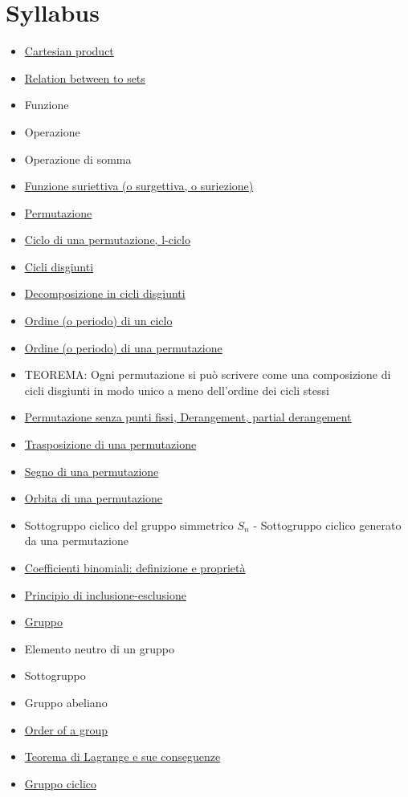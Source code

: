 \documentclass[a4paper,10pt]{article}
\begin{document}
\section{Syllabus}
\begin{itemize}
 \item \href{CartesianProduct.html}{Cartesian product}
 \item \href{Relation.html}{Relation between to sets}
 \item Funzione
 \item Operazione
 \item Operazione di somma
 \item \href{./FunzioneSuriettiva.html}{Funzione suriettiva (o surgettiva, o suriezione)}
 
 \item \href{./Permutazione.html}{Permutazione}
 \item \href{./PermutazioneCicli.html}{Ciclo di una permutazione, l-ciclo}
 \item \href{./PermutazioniDisgiunte.html}{Cicli disgiunti}
 \item \href{./PermutazioneDecomposizioneCicli.html}{Decomposizione in cicli disgiunti}
 \item \href{./PermutazioneCicliPeriodo.html}{Ordine (o periodo) di un ciclo}
 \item \href{./PermutazionePeriodo.html}{Ordine (o periodo) di una permutazione}
 \item TEOREMA: Ogni permutazione si può scrivere come una composizione di cicli disgiunti in modo unico a meno dell'ordine dei cicli stessi
 \item \href{./Derangement.html}{Permutazione senza punti fissi, Derangement, partial derangement}
 \item \href{./PermutazioneTrasposizione.html}{Trasposizione di una permutazione}
 \item \href{./PermutazioneSegno.html}{Segno di una permutazione}
 \item \href{./PermutazioneOrbita.html}{Orbita di una permutazione}
 \item Sottogruppo ciclico del gruppo simmetrico $S_n$ - Sottogruppo ciclico generato da una permutazione
 \item \href{./CoefficientiBinomiali.html}{Coefficienti binomiali: definizione e proprietà}
 \item \href{./PrincipioInclusioneEsclusione.html}{Principio di inclusione-esclusione}
 
 \item \href{./Gruppo.html}{Gruppo}
 \item Elemento neutro di un gruppo
 \item Sottogruppo
 \item Gruppo abeliano
 \item \href{./OrderOfGroup.html}{Order of a group}
 \item \href{./TeoremaDiLagrange.html}{Teorema di Lagrange e sue conseguenze} 
 \item \href{./CyclicGroup.html}{Gruppo ciclico}
 

\end{itemize}
\end{document}
